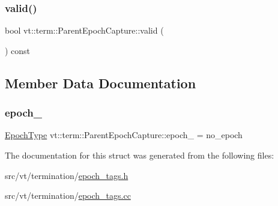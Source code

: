 \mbox{\label{structvt_1_1term_1_1_parent_epoch_capture_a756a8fa40a0e724ca7ea8b5d7a9a8b45}} 
\subsubsection{\texorpdfstring{valid()}{valid()}}
{\footnotesize\ttfamily bool vt\+::term\+::\+Parent\+Epoch\+Capture\+::valid (\begin{DoxyParamCaption}{ }\end{DoxyParamCaption}) const\hspace{0.3cm}{\ttfamily [inline]}}



\subsection{Member Data Documentation}
\mbox{\label{structvt_1_1term_1_1_parent_epoch_capture_a1d8ee50cac9b459aed1ec1295afa03ff}} 
\subsubsection{\texorpdfstring{epoch\+\_\+}{epoch\_}}
{\footnotesize\ttfamily \hyperlink{namespacevt_a985a5adf291c34a3ca263b3378388236}{Epoch\+Type} vt\+::term\+::\+Parent\+Epoch\+Capture\+::epoch\+\_\+ = no\+\_\+epoch\hspace{0.3cm}{\ttfamily [private]}}



The documentation for this struct was generated from the following files\+:\begin{DoxyCompactItemize}
\item 
src/vt/termination/\hyperlink{epoch__tags_8h}{epoch\+\_\+tags.\+h}\item 
src/vt/termination/\hyperlink{epoch__tags_8cc}{epoch\+\_\+tags.\+cc}\end{DoxyCompactItemize}
